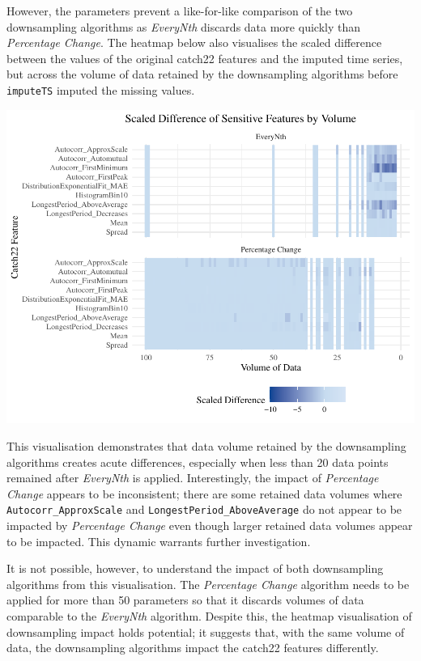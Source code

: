 \documentclass{article}
\begin{document}
However, the parameters prevent a like-for-like comparison of the two
downsampling algorithms as \emph{EveryNth} discards data more quickly
than \emph{Percentage Change}. The heatmap below also visualises the
scaled difference between the values of the original catch22 features
and the imputed time series, but across the volume of data retained by
the downsampling algorithms before \texttt{imputeTS} imputed the missing
values.

\includegraphics{210431461_CSC8639_Dissertation_files/figure-latex/Heatmap_vol-1.pdf}

This visualisation demonstrates that data volume retained by the
downsampling algorithms creates acute differences, especially when less
than 20 data points remained after \emph{EveryNth} is applied.
Interestingly, the impact of \emph{Percentage Change} appears to be
inconsistent; there are some retained data volumes where
\texttt{Autocorr\_ApproxScale} and \texttt{LongestPeriod\_AboveAverage}
do not appear to be impacted by \emph{Percentage Change} even though
larger retained data volumes appear to be impacted. This dynamic
warrants further investigation.

It is not possible, however, to understand the impact of both
downsampling algorithms from this visualisation. The \emph{Percentage
Change} algorithm needs to be applied for more than 50 parameters so
that it discards volumes of data comparable to the \emph{EveryNth}
algorithm. Despite this, the heatmap visualisation of downsampling
impact holds potential; it suggests that, with the same volume of data,
the downsampling algorithms impact the catch22 features differently.
\end{document}
